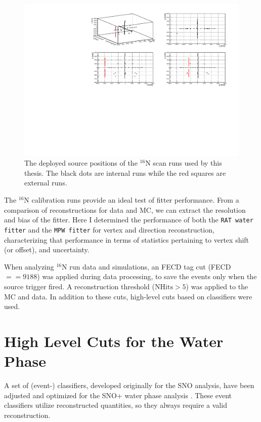 \begin{figure}[!htb]
	\centering
	\includegraphics[width=15cm]{N16_3Dscan.pdf}
	\caption[The deployed source positions of the $^{16}$N scan runs.]{The deployed source positions of the $^{16}$N scan runs used by this thesis. The black dots are internal runs while the red squares are external runs.	\label{N16_3Dscan}}
\end{figure}

The $^{16}$N calibration runs provide an ideal test of fitter performance. From a comparison of reconstructions for data and MC, we can extract the resolution and bias of the fitter. Here I determined the performance of both the \texttt{RAT water fitter} and the \texttt{MPW fitter} for vertex and direction reconstruction, characterizing that performance in terms of statistics pertaining to vertex shift (or offset), and uncertainty. 

When analyzing $^{16}$N run data and simulations, an FECD tag cut (FECD$==9188$) was applied during data processing, to save the events only when the source trigger fired. A reconstruction threshold ($\mathrm{NHits}>5$) was applied to the MC and data. In addition to these cuts, high-level cuts based on classifiers were used. 

\section{High Level Cuts for the Water Phase}\label{sect:high_level_cuts}

A set of (event-) classifiers, developed originally for the SNO analysis, have been adjusted and optimized for the SNO+ water phase analysis \cite{highlevel}. These event classifiers utilize reconstructed quantities, so they always require a valid reconstruction.

